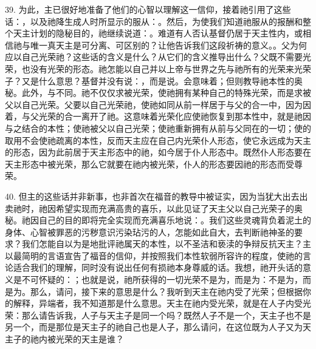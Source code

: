 39. 为此，主已很好地准备了他们的心智以理解这一信仰，接着祂引用了这些话：，以及祂降生成人时所显示的服从：。然后，为使我们知道祂服从的报酬和整个天主计划的隐秘目的，祂继续说道：。难道有人否认基督仍居于天主性内，或相信祂与唯一真天主是可分离、可区别的？让他告诉我们这段祈祷的意义。。父为何应以自己光荣祂？这些话的含义是什么？从它们的含义推导出什么？父既不需要光荣，也没有光荣的形态。祂怎能以自己并以上帝与世界之先与祂所有的光荣来光荣子？又是什么意思？基督并没有说：，而是说。会意味着；但则教导祂本性的奥秘。此外，与不同。祂不仅仅求被光荣，使祂拥有某种自己的特殊光荣，而是求被父以自己光荣。父要以自己光荣祂，使祂如同从前一样居于与父的合一中，因为因着，与父光荣的合一离开了祂。这意味着光荣化应使祂恢复到那本性中，就是祂因与之结合的本性；使祂被父以自己光荣；使祂重新拥有从前与父同在的一切；使的取用不会使祂疏离的本性，反而天主应在自己内光荣仆人形态，使它永远成为天主的形态，因为此前居于天主形态中的祂，如今居于仆人形态中。既然仆人形态要在天主形态中被光荣，那么它就要在祂内被光荣，仆人的形态要因祂的形态而受尊荣。\par

40. 但主的这些话并非新事，也非首次在福音的教导中被证实，因为当犹大出去出卖祂时，祂因希望实现而充满高贵的喜乐，以此见证了天主父以自己光荣子的奥秘。祂因自己的目的即将完全实现而充满喜乐地说：。我们这些灵魂背负着泥土的身体、心智被罪恶的污秽意识污染玷污的人，怎能如此自大，去判断祂神圣的要求？我们怎能自以为是地批评祂属天的本性，以不圣洁和亵渎的争辩反抗天主？主以最简明的言语宣告了福音的信仰，并按照我们本性软弱所容许的程度，使祂的言论适合我们的理解，同时没有说出任何有损祂本身尊威的话。我想，祂开头话的意义是不可怀疑的：；也就是说，祂所获得的一切光荣不是为，而是为：不是为，而是为。那么，请问，接下来的意思是什么？我听到天主在祂内受了光荣；但根据你的解释，异端者，我不知道那是什么意思。天主在祂内受光荣，就是在人子内受光荣：那么请告诉我，人子与天主子是同一个吗？既然人子不是一个，天主子也不是另一个，而是那位是天主子的祂自己也是人子，那么请问，在这位既为人子又为天主子的祂内被光荣的天主是谁？\par


